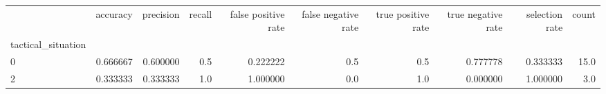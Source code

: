 \begin{tabular}{lrrrrrrrrr}
\toprule
{} &  accuracy &  precision &  recall &  false positive rate &  false negative rate &  true positive rate &  true negative rate &  selection rate &  count \\
tactical\_situation &           &            &         &                      &                      &                     &                     &                 &        \\
\midrule
0                  &  0.666667 &   0.600000 &     0.5 &             0.222222 &                  0.5 &                 0.5 &            0.777778 &        0.333333 &   15.0 \\
2                  &  0.333333 &   0.333333 &     1.0 &             1.000000 &                  0.0 &                 1.0 &            0.000000 &        1.000000 &    3.0 \\
\bottomrule
\end{tabular}
